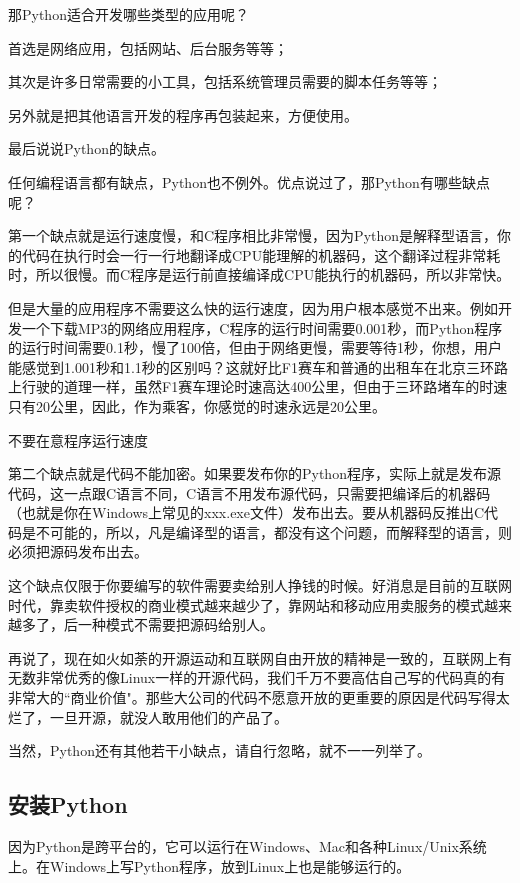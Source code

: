 那Python适合开发哪些类型的应用呢？

首选是网络应用，包括网站、后台服务等等；

其次是许多日常需要的小工具，包括系统管理员需要的脚本任务等等；

另外就是把其他语言开发的程序再包装起来，方便使用。

最后说说Python的缺点。

任何编程语言都有缺点，Python也不例外。优点说过了，那Python有哪些缺点呢？

第一个缺点就是运行速度慢，和C程序相比非常慢，因为Python是解释型语言，你的代码在执行时会一行一行地翻译成CPU能理解的机器码，这个翻译过程非常耗时，所以很慢。而C程序是运行前直接编译成CPU能执行的机器码，所以非常快。

但是大量的应用程序不需要这么快的运行速度，因为用户根本感觉不出来。例如开发一个下载MP3的网络应用程序，C程序的运行时间需要0.001秒，而Python程序的运行时间需要0.1秒，慢了100倍，但由于网络更慢，需要等待1秒，你想，用户能感觉到1.001秒和1.1秒的区别吗？这就好比F1赛车和普通的出租车在北京三环路上行驶的道理一样，虽然F1赛车理论时速高达400公里，但由于三环路堵车的时速只有20公里，因此，作为乘客，你感觉的时速永远是20公里。

不要在意程序运行速度

第二个缺点就是代码不能加密。如果要发布你的Python程序，实际上就是发布源代码，这一点跟C语言不同，C语言不用发布源代码，只需要把编译后的机器码（也就是你在Windows上常见的xxx.exe文件）发布出去。要从机器码反推出C代码是不可能的，所以，凡是编译型的语言，都没有这个问题，而解释型的语言，则必须把源码发布出去。

这个缺点仅限于你要编写的软件需要卖给别人挣钱的时候。好消息是目前的互联网时代，靠卖软件授权的商业模式越来越少了，靠网站和移动应用卖服务的模式越来越多了，后一种模式不需要把源码给别人。

再说了，现在如火如荼的开源运动和互联网自由开放的精神是一致的，互联网上有无数非常优秀的像Linux一样的开源代码，我们千万不要高估自己写的代码真的有非常大的``商业价值"。那些大公司的代码不愿意开放的更重要的原因是代码写得太烂了，一旦开源，就没人敢用他们的产品了。

当然，Python还有其他若干小缺点，请自行忽略，就不一一列举了。

\subsection{安装Python}
因为Python是跨平台的，它可以运行在Windows、Mac和各种Linux/Unix系统上。在Windows上写Python程序，放到Linux上也是能够运行的。

